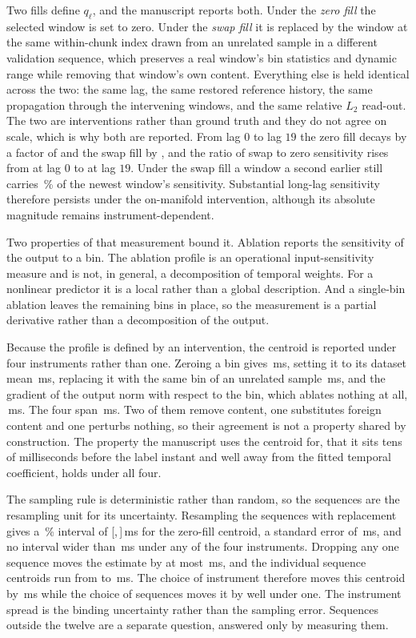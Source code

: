 \documentclass[10pt,twocolumn,letterpaper]{article}
\begin{document}
Two fills define $q_{\ell}$, and the manuscript reports both. Under the \emph{zero fill}
the selected window is set to zero. Under the \emph{swap fill} it is replaced by the window
at the same within-chunk index drawn from an unrelated sample in a different validation
sequence, which preserves a real window's bin statistics and dynamic range while removing
that window's own content. Everything else is held identical across the two: the same lag,
the same restored reference history, the same propagation through the intervening windows,
and the same relative $L_{2}$ read-out. The two are interventions rather than ground truth
and they do not agree on scale, which is why both are reported. From lag $0$ to lag $19$ the
zero fill decays by a factor of \histDecayZero{} and the swap fill by \histDecaySwap{}, and
the ratio of swap to zero sensitivity rises from \histSwapRatioLo{} at lag $0$ to
\histSwapRatioHi{} at lag $19$. Under the swap fill a window a second earlier still carries
\histTailSwapPct\,\% of the newest window's sensitivity. Substantial long-lag sensitivity
therefore persists under the on-manifold intervention, although its absolute magnitude remains
instrument-dependent.

Two properties of that measurement bound it. Ablation reports the sensitivity of
the output to a bin. The ablation profile is an operational input-sensitivity
measure and is not, in general, a decomposition of temporal weights. For a
nonlinear predictor it is a local rather than a global description. And a single-bin ablation
leaves the remaining bins in place, so the measurement is a partial derivative
rather than a decomposition of the output.

Because the profile is defined by an intervention, the centroid is reported under four
instruments rather than one. Zeroing a bin gives \occZero\,ms, setting it to its dataset
mean \occMean\,ms, replacing it with the same bin of an unrelated sample \occSwap\,ms, and
the gradient of the output norm with respect to the bin, which ablates nothing at all,
\occGrad\,ms. The four span \occSpread\,ms. Two of them remove content, one substitutes
foreign content and one perturbs nothing, so their agreement is not a property shared by
construction. The property the manuscript uses the centroid for, that it sits tens of milliseconds
before the label instant and well away from the fitted temporal coefficient, holds under
all four.

The sampling rule is deterministic rather than random, so the sequences are the resampling
unit for its uncertainty. Resampling the \occSeqs{} sequences with replacement gives a
\bootCI\,\% interval of [\occSeqCiLo,\,\occSeqCiHi]\,ms for the zero-fill centroid, a standard
error of \occSeqSE\,ms, and no interval wider than \occSeqWidest\,ms under any of the four
instruments. Dropping any one sequence moves the estimate by at most \occSeqLoo\,ms, and the
individual sequence centroids run from \occPerSeqLo{} to \occPerSeqHi\,ms. The choice of
instrument therefore moves this centroid by \occSpread\,ms while the choice of sequences moves
it by well under one. The instrument spread is the binding uncertainty rather than the sampling
error. Sequences outside the twelve are a separate
question, answered only by measuring them.
\end{document}
